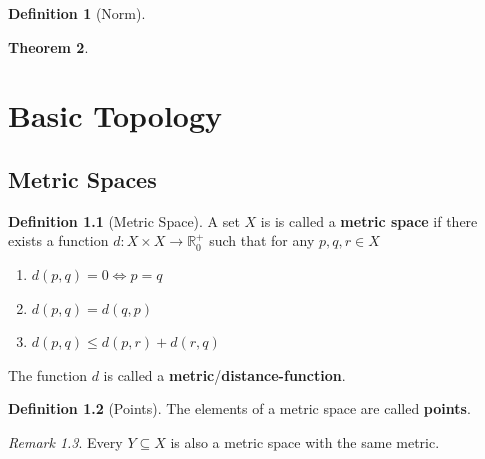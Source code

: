 \documentclass[a4paper,12pt]{report}
\newcommand{\R}{\mathbb{R}}
\newcommand{\tb}{\textbf}
\theoremstyle{plain}
\newtheorem{theorem}{\color{blue}Theorem}[chapter] %
\theoremstyle{definition}
\newtheorem{definition}[theorem]{\color{red}Definition} %
\theoremstyle{remark}
\newtheorem{remark}[theorem]{\color{ForestGreen}Remark} %
\begin{document}
\begin{definition}[Norm]
\end{definition}

\begin{theorem}
\end{theorem}

\chapter{Basic Topology}
\section{Metric Spaces}
\begin{definition}[Metric Space]
A set $X$ is is called a \tb{metric space} if there exists a function $d:X\times X\to \R_0^+$ such that for any $p,q,r\in X$
\begin{enumerate}
\item $d(p,q)=0\iff p=q$
\item $d(p,q)=d(q,p)$
\item $d(p,q)\le d(p,r)+d(r,q)$
\end{enumerate}
The function $d$ is called a \tb{metric}/\tb{distance-function}.
\end{definition}
\begin{definition}[Points]
The elements of a metric space are called \tb{points}.
\end{definition}
\begin{remark}
Every $Y\subseteq X$ is also a metric space with the same metric.
\end{remark}
\end{document}
